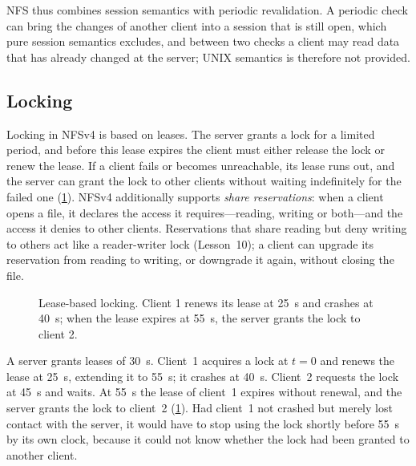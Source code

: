 \documentclass[../main.tex]{subfiles}
\begin{document}
\begin{note}
  NFS thus combines session semantics with periodic revalidation.  A periodic check can bring the changes of another client into a session
  that is still open, which pure session semantics excludes, and between
  two checks a client may read data that has already changed at the
  server; UNIX semantics is therefore not provided.
\end{note}

\subsection{Locking}

Locking in NFSv4 is based on leases.  The server grants a
lock for a limited period, and before this lease expires the client must
either release the lock or renew the lease.
If a client fails or becomes unreachable, its lease runs out, and the
server can grant the lock to other clients without waiting indefinitely
for the failed one (\cref{fig:l14-lease}).  NFSv4 additionally supports
\emph{share reservations}: when a client opens a file, it declares the
access it requires---reading, writing or both---and the access it denies
to other clients.  Reservations that share reading but deny writing to
others act like a reader-writer lock
(Lesson~10); a client can upgrade its reservation from reading to writing,
or downgrade it again, without closing the file.

\begin{figure}[htbp]
  \centering
  
  \caption{Lease-based locking.  Client 1 renews its lease at
    \SI{25}{\second} and crashes at \SI{40}{\second}; when the lease
    expires at \SI{55}{\second}, the server grants the lock to client 2.}
  \label{fig:l14-lease}
\end{figure}

\begin{example}
  A server grants leases of \SI{30}{\second}.
  Client~1 acquires a lock at
  $t=0$ and renews the lease at \SI{25}{\second}, extending it to
  \SI{55}{\second}; it crashes at \SI{40}{\second}.  Client~2 requests the
  lock at \SI{45}{\second} and waits.  At \SI{55}{\second} the lease of
  client~1 expires without renewal, and the server grants the lock to
  client~2 (\cref{fig:l14-lease}).  Had client~1 not crashed but merely lost
  contact with the server, it would have to stop using the lock shortly
  before \SI{55}{\second} by its own clock, because it could not know
  whether the lock had been granted to another client.
\end{example}
\end{document}
